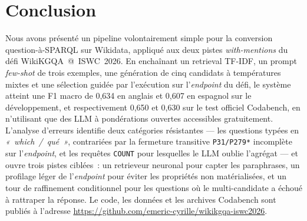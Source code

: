 \documentclass[]{ceurart}
\begin{document}
\section{Conclusion}
\label{sec:conclusion}
Nous avons présenté un pipeline volontairement simple pour la conversion question-à-SPARQL sur Wikidata, appliqué aux deux pistes \emph{with-mentions} du défi WikiKGQA~@~ISWC~2026. En enchaînant un retrieval TF-IDF, un prompt \emph{few-shot} de trois exemples, une génération de cinq candidats à températures mixtes et une sélection guidée par l'exécution sur l'\emph{endpoint} du défi, le système atteint une F1 macro de 0{,}634 en anglais et 0{,}607 en espagnol sur le développement, et respectivement 0{,}650 et 0{,}630 sur le test officiel Codabench, en n'utilisant que des LLM à pondérations ouvertes accessibles gratuitement. L'analyse d'erreurs identifie deux catégories résistantes — les questions typées en \emph{«~which~/~qué~»}, contrariées par la fermeture transitive \texttt{P31/P279*} incomplète sur l'\emph{endpoint}, et les requêtes \texttt{COUNT} pour lesquelles le LLM oublie l'agrégat — et ouvre trois pistes ciblées~: un retrieveur neuronal pour capter les paraphrases, un profilage léger de l'\emph{endpoint} pour éviter les propriétés non matérialisées, et un tour de raffinement conditionnel pour les questions où le multi-candidate a échoué à rattraper la réponse. Le code, les données et les archives Codabench sont publiés à l'adresse \url{https://github.com/emeric-cyrille/wikikgqa-iswc2026}.


\end{document}

